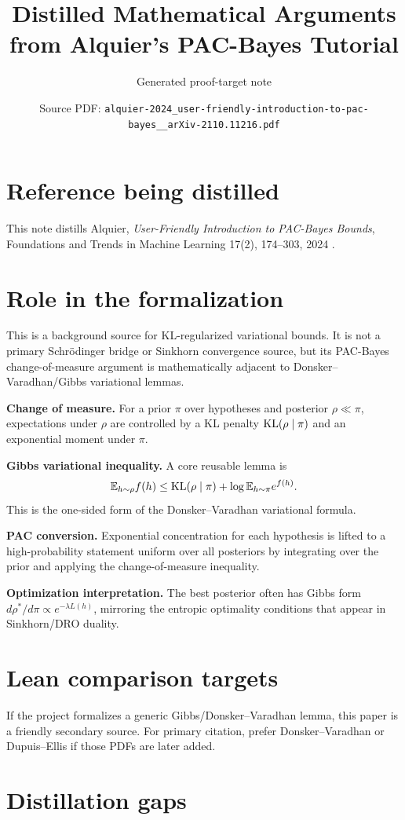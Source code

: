 
\title{Distilled Mathematical Arguments from Alquier's PAC-Bayes Tutorial}
\author{Generated proof-target note}
\date{Source PDF: \texttt{alquier-2024\_user-friendly-introduction-to-pac-bayes\_\_arXiv-2110.11216.pdf}}

\maketitle

\section*{Reference being distilled}
This note distills Alquier, \emph{User-Friendly Introduction to PAC-Bayes Bounds}, Foundations and Trends in Machine Learning 17(2), 174--303, 2024 \cite{Alquier2024}.

\section*{Role in the formalization}
This is a background source for KL-regularized variational bounds.  It is not a primary Schr\"odinger bridge or Sinkhorn convergence source, but its PAC-Bayes change-of-measure argument is mathematically adjacent to Donsker--Varadhan/Gibbs variational lemmas.

\begin{distillation}
\item \textbf{Change of measure.}  For a prior $\pi$ over hypotheses and posterior $\rho\ll\pi$, expectations under $\rho$ are controlled by a KL penalty $\mathrm{KL}(\rho\mid\pi)$ and an exponential moment under $\pi$.
\item \textbf{Gibbs variational inequality.}  A core reusable lemma is
\[
  \mathbb{E}_{h\sim\rho} f(h)
  \le \mathrm{KL}(\rho\mid\pi)+\log \mathbb{E}_{h\sim\pi}e^{f(h)}.
\]
This is the one-sided form of the Donsker--Varadhan variational formula.
\item \textbf{PAC conversion.}  Exponential concentration for each hypothesis is lifted to a high-probability statement uniform over all posteriors by integrating over the prior and applying the change-of-measure inequality.
\item \textbf{Optimization interpretation.}  The best posterior often has Gibbs form $d\rho^*/d\pi\propto e^{-\lambda L(h)}$, mirroring the entropic optimality conditions that appear in Sinkhorn/DRO duality.
\end{distillation}

\section*{Lean comparison targets}
If the project formalizes a generic Gibbs/Donsker--Varadhan lemma, this paper is a friendly secondary source.  For primary citation, prefer Donsker--Varadhan or Dupuis--Ellis if those PDFs are later added.

\section*{Distillation gaps}



